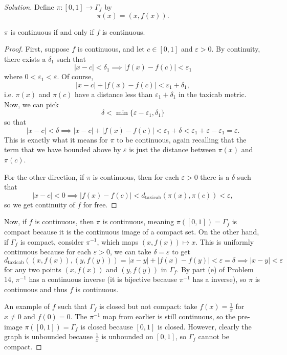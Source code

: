 \documentclass[11pt]{scrartcl}
\providecommand{\eps}{\varepsilon}
\providecommand{\inv}{^{-1}}
\newenvironment{soln}{\begin{proof}[Solution]}{\end{proof}}
\begin{document}
\begin{soln}
	Define $\pi\colon[0,1]\to\Gamma_f$ by
	\[\pi(x) = (x, f(x)).\]
	\begin{claim}
		$\pi$ is continuous if and only if $f$ is continuous.
	\end{claim}
	\begin{proof}
		First, suppose $f$ is continuous, and let $c\in[0,1]$ and $\eps > 0$.
		By continuity, there exists a $\delta_1$ such that
		\[|x - c| < \delta_1 \implies |f(x) - f(c)| < \eps_1\]
		where $0 < \eps_1 < \eps$.
		Of course,
		\[|x - c| + |f(x) - f(c)| < \eps_1 + \delta_1,\]
		i.e. $\pi(x)$ and $\pi(c)$ have a distance less than $\eps_1+\delta_1$
		in the taxicab metric. Now, we can pick
		\[\delta < \min\{\eps - \eps_1, \delta_1\}\]
		so that
		\[|x - c| < \delta \implies |x - c| + |f(x) - f(c)| <
		\eps_1 + \delta < \eps_1 + \eps - \eps_1 = \eps.\]
		This is exactly what it means for $\pi$ to be continuous,
		again recalling that the term that we have bounded above by $\eps$
		is just the distance between $\pi(x)$ and $\pi(c)$.
		
		For the other direction, if $\pi$ is continuous, then
		for each $\eps > 0$ there is a $\delta$ such that
		\[|x - c| < 0 \implies |f(x) - f(c)|
		< d_{\text{taxicab}}(\pi(x),\pi(c)) < \eps,\]
		so we get continuity of $f$ for free.
	\end{proof}

	Now, if $f$ is continuous, then $\pi$ is continuous, meaning
	$\pi([0,1]) = \Gamma_f$ is compact because it is
	the continuous image of a compact set.
	On the other hand, if $\Gamma_f$ is compact,
	consider $\pi\inv$, which maps $(x, f(x))\mapsto x$.
	This is uniformly continuous because for each $\eps > 0$,
	we can take $\delta = \eps$ to get
	\[d_{\text{taxicab}}((x, f(x)), (y, f(y))) =
	|x - y| + |f(x) - f(y)| < \eps = \delta \implies
	|x - y| < \eps\]
	for any two points $(x, f(x))$ and $(y, f(y))$ in $\Gamma_f$.
	By part (e) of Problem 14, $\pi\inv$ has a continuous inverse
	(it is bijective because $\pi\inv$ has a inverse),
	so $\pi$ is continuous and thus $f$ is continuous.
	
	An example of $f$ such that $\Gamma_f$ is closed but not compact:
	take $f(x) = \frac{1}{x}$ for $x\ne 0$ and $f(0) = 0$.
	The $\pi\inv$ map from earlier is still continuous,
	so the pre-image $\pi([0,1]) = \Gamma_f$ is closed
	because $[0,1]$ is closed. However, clearly the graph is unbounded
	because $\frac 1x$ is unbounded on $[0,1]$, so
	$\Gamma_f$ cannot be compact.
\end{soln}
\end{document}
